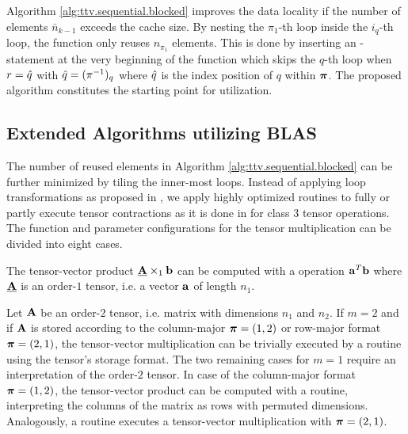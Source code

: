 Algorithm \ref{alg:ttv.sequential.blocked} improves the data locality if the number of elements $\bar{n}_{k-1}$ exceeds the cache size.
By nesting the $\pi_1$-th loop inside the $i_q$-th loop, the function only reuses $n_{\pi_1}$ elements.
This is done by inserting an -statement at the very beginning of the function which skips the $q$-th loop when $r = \hat{q}$ with $\hat{q} = (\pi^{-1})_q$ where
$\hat{q}$ is the index position of $q$ within $\boldsymbol{\pi}$.
The proposed algorithm constitutes the starting point for  utilization.

\subsection{Extended Algorithms utilizing BLAS}
\label{subsec:linear.algebra.routines}
\vspace{-0.3em}
The number of reused elements in Algorithm \ref{alg:ttv.sequential.blocked} can be further minimized by tiling the inner-most loops.
Instead of applying loop transformations as proposed in \cite{springer:2018:design,matthews:2018:high}, we apply highly optimized routines to fully or partly execute tensor contractions as it is done in \cite{li:2015:input,shi:2016:tensor.contraction} for class 3 tensor operations.
The function and parameter configurations for the tensor multiplication can be divided into eight cases.

The tensor-vector product $\underline{\mathbf{A}} \times_1 \mathbf{b}$ can be computed with a  operation $\mathbf{a}^T \mathbf{b}$ where $\underline{\mathbf{A}}$ is an order-$1$ tensor, i.e. a vector $\mathbf{a}$ of length $n_1$.

Let $\mathbf{A}$ be an order-$2$ tensor, i.e. matrix with dimensions $n_1$ and $n_2$.
If $m=2$ and if $\mathbf{A}$ is stored according to the column-major $\boldsymbol{\pi}=(1,2)$ or row-major format $\boldsymbol{\pi}=(2,1)$, the tensor-vector multiplication can be trivially executed by a  routine using the tensor's storage format.
The two remaining cases for $m=1$ require an interpretation of the order-$2$ tensor. 
In case of the column-major format $\boldsymbol{\pi}=(1,2)$, the tensor-vector product can be computed with a  routine, interpreting the columns of the matrix as rows with permuted dimensions.
Analogously, a  routine executes a tensor-vector multiplication with $\boldsymbol{\pi}=(2,1)$.

